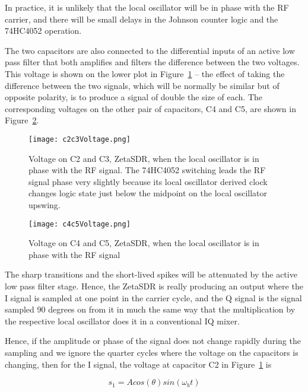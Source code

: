 \documentclass[11pt, twoside]{article}
\begin{document}
In practice, it is unlikely that the local oscillator will be in phase
with the RF carrier, and there will be small delays in the Johnson
counter logic and the 74HC4052 operation.

The two capacitors are also connected to the differential inputs of an
active low pass filter that both amplifies and filters the difference
between the two voltages.  This voltage is shown on the lower plot in
Figure~\ref{figure:C2C3simple} -- the effect of taking the difference
between the two signals, which will be normally be similar but of
opposite polarity, is to produce a signal of double the size of each.
The corresponding voltages on the other pair of capacitors, C4 and C5,
are shown in Figure~\ref{figure:C4C5simple}.

\begin{figure}
  \center
  \captionsetup{width=.8\linewidth}
  \texttt{[image: c2c3Voltage.png]}
  \caption{Voltage on C2 and C3, ZetaSDR, when the local
    oscillator is in phase with the RF signal. The 74HC4052 switching
    leads the RF signal phase very slightly because its local
    oscillator derived clock changes logic state just below the
    midpoint on the local oscillator upswing.  }
  \label{figure:C2C3simple}
\end{figure}


\begin{figure}
  \center
  \captionsetup{width=.8\linewidth}
  \texttt{[image: c4c5Voltage.png]}
  \caption{Voltage on C4 and C5, ZetaSDR, when the local
    oscillator is in phase with the RF signal}
  \label{figure:C4C5simple}
\end{figure}

The sharp transitions and the short-lived spikes will be attenuated by
the active low pass filter stage.  Hence, the ZetaSDR is really
producing an output where the I signal is sampled at one point in the
carrier cycle, and the Q signal is the signal sampled 90 degrees on
from it in much the same way that the multiplication by the respective
local oscillator does it in a conventional IQ mixer.

Hence, if the amplitude or phase of the signal does not change
rapidly during the sampling and we ignore the quarter cycles where the
voltage on the capacitors is changing, then for the I signal, the
voltage at capacitor C2  in Figure~\ref{figure:C2C3simple} is

\begin{equation*}
  s_1 = A cos(\theta) sin({\omega_b}t)
\end{equation*}
\end{document}
